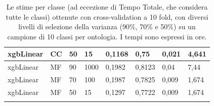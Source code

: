 \documentclass[12pt]{report}
\begin{document}
\begin{appendices}
\begin{longtable}[h]{|l|l|l|l|l|l|l|l|}
xgbLinear          & CC            & 50                & 15                 & 0,1168         & 0,75           & 0,021                    & 4,641                \\ \hline
xgbLinear          & MF            & 90                & 1000               & 0,1982         & 0,8123         & 0,04                     & 7,44                 \\ \hline
xgbLinear          & MF            & 70                & 100                & 0,1987         & 0,7825         & 0,009                    & 1,674                \\ \hline
xgbLinear          & MF            & 50                & 15                 & 0,1297         & 0,7722         & 0,009                    & 1,674                \\ \hline
\caption{\footnotesize{Le stime per classe (ad eccezione di Tempo Totale, che considera tutte le classi) ottenute con cross-validation a 10 fold, con diversi livelli di selezione della varianza (90\%, 70\% e 50\%) su un campione di 10 classi per ontologia. I tempi sono espressi in ore.}}
\label{diffvariance}
\end{longtable}


\end{appendices}
\end{document}

